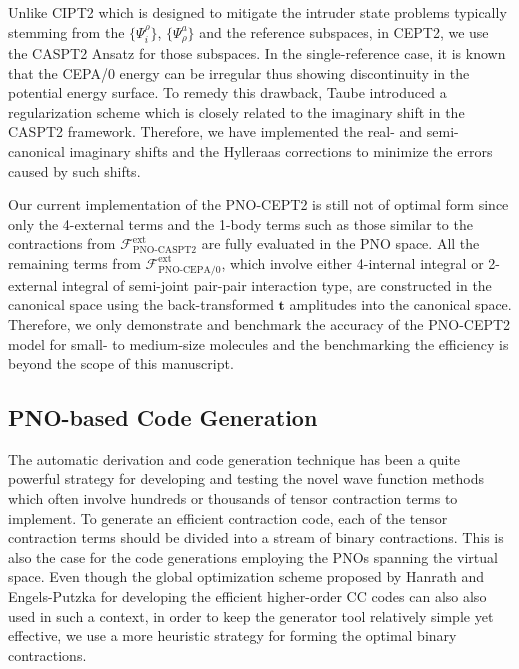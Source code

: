 \documentclass[aip,jcp,amsmath]{revtex4-1}
\begin{document}
%
Unlike CIPT2 which is designed to mitigate the intruder state problems typically stemming from the $\{\Psi_i^\rho\}$, $\{\Psi_\rho^a\}$ and the reference subspaces, in CEPT2, we use the CASPT2 Ansatz for those subspaces.
%
In the single-reference case, it is known that the CEPA/0 energy can be irregular thus showing discontinuity in the potential energy surface.
%
To remedy this drawback, Taube introduced a regularization scheme which is closely related to the imaginary shift in the CASPT2 framework.\cite{doi:10.1063/1.3115467}
%
Therefore, we have implemented the real- and semi-canonical imaginary shifts and the Hylleraas corrections to minimize the errors caused by such shifts.

%
Our current implementation of the PNO-CEPT2 is still not of optimal form since only the 4-external terms and the 1-body terms such as those similar to the contractions from $\mathscr{F}_\text{PNO-CASPT2}^\text{ext}$ are fully evaluated in the PNO space.
%
All the remaining terms from $\mathscr{F}_\text{PNO-CEPA/0}^\text{ext}$, which involve either 4-internal integral or 2-external integral of semi-joint pair-pair interaction type,\cite{neeseefficient2009cepa,neeseefficient2009} are constructed in the canonical space using the back-transformed $\mathbf{t}$ amplitudes into the canonical space.
%
Therefore, we only demonstrate and benchmark the accuracy of the PNO-CEPT2 model for small- to medium-size molecules and the benchmarking the efficiency is beyond the scope of this manuscript.

\subsection{PNO-based Code Generation}
%
The automatic derivation and code generation technique has been a quite powerful strategy for developing and testing the novel wave function methods which often involve hundreds or thousands of tensor contraction terms to implement.\cite{CJanssen1991,doi:10.1021/jp034596z,SHirataTCE2004,SHirataTCE2006,doi:10.1080/00268970500275780,KoehnJCP2009_1,KoehnJCP2009_2,MHandKoehn2009,MHandKoehn2011,AK74,AK77,ShiozakiJCP2008,ShiozakiPCCP2008,ShiozakiJCP2009_1,ShiozakiJCP2009_2,doi:10.1063/1.4907717,doi:10.1063/1.4959029,doi:10.1002/jcc.24833,doi:10.1063/1.5001320,doi:10.1063/1.5048688,dattaa2011,doi:10.1063/1.3089302,doi:10.1063/1.3664729,PCMRCI2011}
%
To generate an efficient contraction code, each of the tensor contraction terms should be divided into a stream of binary contractions.
%
This is also the case for the code generations employing the PNOs spanning the virtual space.
%
Even though the global optimization scheme proposed by Hanrath and Engels-Putzka for developing the efficient higher-order CC codes\cite{hanrathan2010,engels-putzkaa2011} can also also used in such a context, in order to keep the generator tool relatively simple yet effective, we use a more heuristic strategy for forming the optimal binary contractions.
\end{document}
